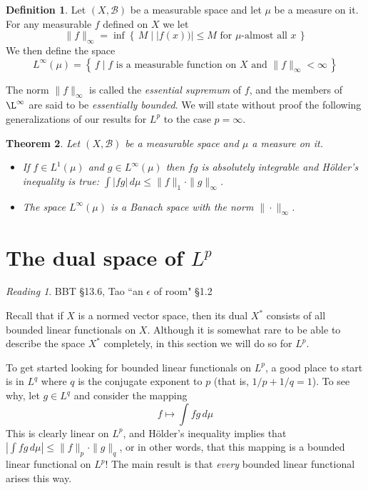 \documentclass[11pt,oneside]{amsbook}
\newcommand{\set}[1]{\left\{\,#1\,\right\}}
\theoremstyle{definition}
\theoremstyle{plain}
\newtheorem{thm}{Theorem}[section]
\theoremstyle{definition}
\newtheorem{defn}[thm]{Definition}
\theoremstyle{remark}
\newtheorem*{reading}{Reading}
\numberwithin{equation}{section}
\numberwithin{figure}{section}
\begin{document}
\begin{defn}
  Let $(X,\mathcal B)$ be a measurable space and let $\mu$ be a measure on it. For any measurable $f$ defined on $X$ we let
  \[\|f\|_\infty=\inf\set{M\mid |f(x))|\leq M\text{ for $\mu$-almost all $x$}}
  \]
  We then define the space
  \[L^\infty(\mu)=\set{f\mid\text{$f$ is a measurable function on $X$ and } \|f\|_\infty<\infty}
  \]
\end{defn}

The norm $\|f\|_\infty$ is called the \emph{essential supremum} of $f$, and the members of $\L^\infty$ are said to be \emph{essentially bounded}. We will state without proof the following generalizations of our results for $L^p$ to the case $p=\infty$.

\begin{thm}
  Let $(X,\mathcal B)$ be a measurable space and $\mu$ a measure on it.
  \begin{itemize}
  \item If $f\in L^1(\mu)$ and $g\in L^\infty(\mu)$ then $fg$ is absolutely integrable and H\"older's inequality is true: $\int|fg|\,d\mu\leq\|f\|_1\cdot\|g\|_\infty$.
  \item The space $L^\infty(\mu)$ is a Banach space with the norm $\|\cdot\|_\infty$.
  \end{itemize}
\end{thm}

\newpage
\section{The dual space of $L^p$}

\begin{reading}
  BBT \S 13.6, Tao ``an $\epsilon$ of room" \S 1.2
\end{reading}

Recall that if $X$ is a normed vector space, then its dual $X^*$ consists of all bounded linear functionals on $X$. Although it is somewhat rare to be able to describe the space $X^*$ completely, in this section we will do so for $L^p$.

To get started looking for bounded linear functionals on $L^p$, a good place to start is in $L^q$ where $q$ is the conjugate exponent to $p$ (that is, $1/p+1/q=1$). To see why, let $g\in L^q$ and consider the mapping
\[f\mapsto \int fg\,d\mu
\]
This is clearly linear on $L^p$, and H\"older's inequality implies that $\left|\int fg\,d\mu\right|\leq\|f\|_p\cdot\|g\|_q$, or in other words, that this mapping is a bounded linear functional on $L^p$! The main result is that \emph{every} bounded linear functional arises this way.
\end{document}
